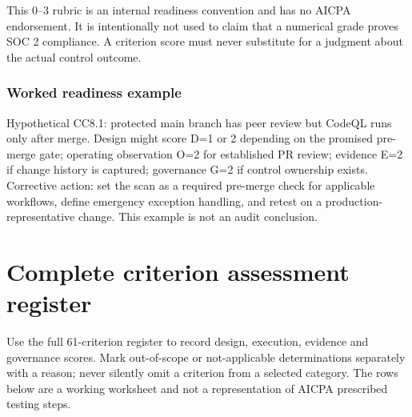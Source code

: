 \documentclass[10pt,oneside]{report}
\begin{document}
This 0--3 rubric is an internal readiness convention and has no AICPA endorsement. It is intentionally not used to claim that a numerical grade proves SOC 2 compliance. A criterion score must never substitute for a judgment about the actual control outcome.

\subsection{Worked readiness example}
Hypothetical CC8.1: protected main branch has peer review but CodeQL runs only after merge. Design might score D=1 or 2 depending on the promised pre-merge gate; operating observation O=2 for established PR review; evidence E=2 if change history is captured; governance G=2 if control ownership exists. Corrective action: set the scan as a required pre-merge check for applicable workflows, define emergency exception handling, and retest on a production-representative change. This example is not an audit conclusion.

\chapter{Complete criterion assessment register}
Use the full 61-criterion register to record design, execution, evidence and governance scores. Mark out-of-scope or not-applicable determinations separately with a reason; never silently omit a criterion from a selected category. The rows below are a working worksheet and not a representation of AICPA prescribed testing steps.
\end{document}
